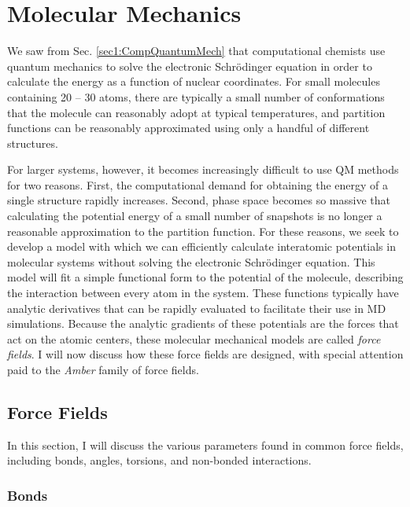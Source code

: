 \section{Molecular Mechanics}

We saw from Sec. \ref{sec1:CompQuantumMech} that computational chemists use
quantum mechanics to solve the electronic Schr\"odinger equation in order to
calculate the energy as a function of nuclear coordinates. For small molecules
containing 20 -- 30 atoms, there are typically a small number of conformations
that the molecule can reasonably adopt at typical temperatures, and partition
functions can be reasonably approximated using only a handful of different
structures.

For larger systems, however, it becomes increasingly difficult to use QM methods
for two reasons. First, the computational demand for obtaining the energy of a
single structure rapidly increases. Second, phase space becomes so massive that
calculating the potential energy of a small number of snapshots is no longer a
reasonable approximation to the partition function. For these reasons, we seek
to develop a model with which we can efficiently calculate interatomic
potentials in molecular systems without solving the electronic Schr\"odinger
equation. This model will fit a simple functional form to the potential of the
molecule, describing the interaction between every atom in the system.  These
functions typically have analytic derivatives that can be rapidly evaluated to
facilitate their use in MD simulations. Because the analytic gradients of these
potentials are the forces that act on the atomic centers, these molecular
mechanical models are called \emph{force fields}. I will now discuss how these
force fields are designed, with special attention paid to the \emph{Amber}
family of force fields.

\subsection{Force Fields}

In this section, I will discuss the various parameters found in common force
fields, including bonds, angles, torsions, and non-bonded interactions.

\subsubsection{Bonds}
\label{sec1:Bond}

